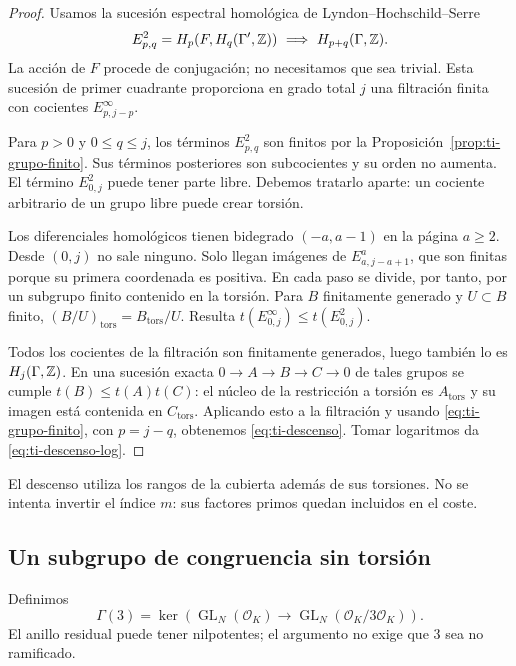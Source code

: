 \begin{proof}
Usamos la sucesión espectral homológica de
Lyndon--Hochschild--Serre
\begin{equation}
 E^2_{p,q}=H_p(F,H_q(\Gamma',\mathbb{Z}))
 \ \Longrightarrow\ H_{p+q}(\Gamma,\mathbb{Z}).
 \label{eq:ti-lhs}
\end{equation}
La acción de $F$ procede de conjugación; no necesitamos que
sea trivial. Esta sucesión de primer cuadrante proporciona
en grado total $j$ una filtración finita con cocientes
$E^\infty_{p,j-p}$.

Para $p>0$ y $0\le q\le j$, los términos $E^2_{p,q}$ son finitos por la
Proposición~\ref{prop:ti-grupo-finito}. Sus términos posteriores
son subcocientes y su orden no aumenta.
El término $E^2_{0,j}$ puede tener parte libre. Debemos
tratarlo aparte: un cociente arbitrario de un grupo libre
puede crear torsión.

Los diferenciales homológicos tienen bidegrado $(-a,a-1)$
en la página $a\ge2$. Desde $(0,j)$ no sale ninguno.
Solo llegan imágenes de $E^a_{a,j-a+1}$, que son finitas
porque su primera coordenada es positiva. En cada paso
se divide, por tanto, por un subgrupo finito contenido en
la torsión. Para $B$ finitamente generado y $U\subset B$
finito, $(B/U)_{\mathrm{tors}}=B_{\mathrm{tors}}/U$.
Resulta
$t(E^\infty_{0,j})\le t(E^2_{0,j})$.

Todos los cocientes de la filtración son finitamente
generados, luego también lo es $H_j(\Gamma,\mathbb{Z})$.
En una sucesión exacta $0\to A\to B\to C\to0$ de tales
grupos se cumple $t(B)\le t(A)t(C)$: el núcleo de la
restricción a torsión es $A_{\mathrm{tors}}$ y su imagen
está contenida en $C_{\mathrm{tors}}$.
Aplicando esto a la filtración y usando
\eqref{eq:ti-grupo-finito}, con $p=j-q$, obtenemos
\eqref{eq:ti-descenso}. Tomar logaritmos da
\eqref{eq:ti-descenso-log}.
\end{proof}

El descenso utiliza los rangos de la cubierta además de sus
torsiones. No se intenta invertir el índice $m$: sus factores
primos quedan incluidos en el coste.

\subsection{Un subgrupo de congruencia sin torsión}

Definimos
\[
 \Gamma(3)=\ker\!\left(
 \operatorname{GL}_N(\mathcal O_K)\longrightarrow
 \operatorname{GL}_N(\mathcal O_K/3\mathcal O_K)\right).
\]
El anillo residual puede tener nilpotentes; el argumento
no exige que $3$ sea no ramificado.

